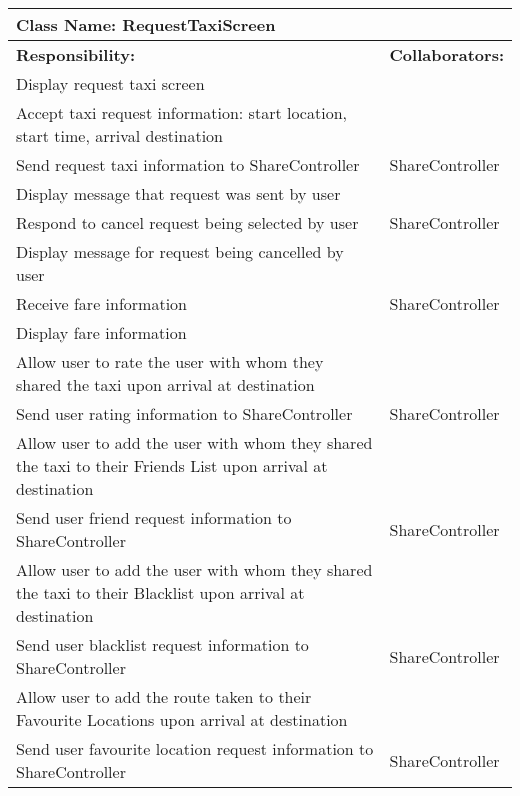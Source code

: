 \documentclass[english]{article}
\begin{document}
    \begin{table}[!ht]
        \centering
        \begin{tabular}{|p{8cm}|p{4cm}|}
        \hline 
        \multicolumn{2}{|l|}{\textbf{Class Name: RequestTaxiScreen}} \\
        \hline
        \textbf{Responsibility:} & \textbf{Collaborators:} \\
        \hline
        Display request taxi screen & \\
        \hline
        Accept taxi request information: start location, start time, arrival destination & \\
        \hline
        Send request taxi information to ShareController & ShareController \\
        \hline
        Display message that request was sent by user & \\
        \hline
        Respond to cancel request being selected by user & ShareController \\
        \hline
        Display message for request being cancelled by user & \\
        \hline
        Receive fare information & ShareController \\
        \hline
        Display fare information & \\
        \hline
        Allow user to rate the user with whom they shared the taxi upon arrival at destination & \\
        \hline
        Send user rating information to ShareController & ShareController \\
        \hline
        Allow user to add the user with whom they shared the taxi to their Friends List upon arrival at destination & \\
        \hline
        Send user friend request information to ShareController & ShareController \\
        \hline
        Allow user to add the user with whom they shared the taxi to their Blacklist upon arrival at destination & \\
        \hline
        Send user blacklist request information to ShareController & ShareController \\
        \hline
        Allow user to add the route taken to their Favourite Locations upon arrival at destination & \\
        \hline
        Send user favourite location request information to ShareController & ShareController \\
        \hline
        \end{tabular}
    \end{table}
    
\end{document}
